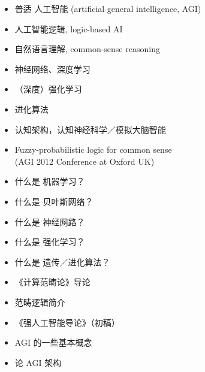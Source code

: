 \documentclass[10pt,a4paper]{altacv}
\begin{document}
\medskip


\begin{itemize}
	\item 普适 人工智能 (artificial general intelligence, AGI)
	\item 人工智能逻辑, logic-based AI
	\item 自然语言理解, common-sense reasoning
	\item 神经网络、深度学习
	\item （深度）强化学习
	\item 进化算法
	\item 认知架构，认知神经科学／模拟大脑智能
\end{itemize}

\medskip


\begin{itemize}
	\item Fuzzy-probabilistic logic for common sense \\
	(AGI 2012 Conference at Oxford UK)
\end{itemize}

%

\medskip


\begin{itemize}
	\item 什么是 机器学习？
	\item 什么是 贝叶斯网络？
	\item 什么是 神经网路？
	\item 什么是 强化学习？
	\item 什么是 遗传／进化算法？
	\item 《计算范畴论》导论
	\item 范畴逻辑简介
	\item 《强人工智能导论》（初稿）
	\item AGI 的一些基本概念
	\item 论 AGI 架构
\end{itemize}

\clearpage


\end{document}
